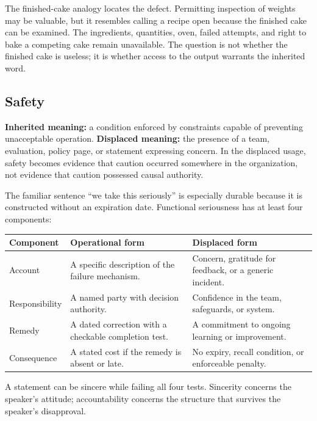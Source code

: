 \documentclass[11pt]{article}
\begin{document}
The finished-cake analogy locates the defect. Permitting inspection of weights may be valuable, but it resembles calling a recipe open because the finished cake can be examined. The ingredients, quantities, oven, failed attempts, and right to bake a competing cake remain unavailable. The question is not whether the finished cake is useless; it is whether access to the output warrants the inherited word.

\subsection*{Safety}

\textbf{Inherited meaning:} a condition enforced by constraints capable of preventing unacceptable operation. \textbf{Displaced meaning:} the presence of a team, evaluation, policy page, or statement expressing concern. In the displaced usage, safety becomes evidence that caution occurred somewhere in the organization, not evidence that caution possessed causal authority.

The familiar sentence \enquote{we take this seriously} is especially durable because it is constructed without an expiration date. Functional seriousness has at least four components:

\begin{center}
\small
\begin{tabularx}{\textwidth}{@{}p{}XX@{}}
\toprule
\textbf{Component} & \textbf{Operational form} & \textbf{Displaced form} \\
\midrule
Account & A specific description of the failure mechanism. & Concern, gratitude for feedback, or a generic incident. \\
Responsibility & A named party with decision authority. & Confidence in the team, safeguards, or system. \\
Remedy & A dated correction with a checkable completion test. & A commitment to ongoing learning or improvement. \\
Consequence & A stated cost if the remedy is absent or late. & No expiry, recall condition, or enforceable penalty. \\
\bottomrule
\end{tabularx}
\end{center}

A statement can be sincere while failing all four tests. Sincerity concerns the speaker's attitude; accountability concerns the structure that survives the speaker's disapproval.
\end{document}
